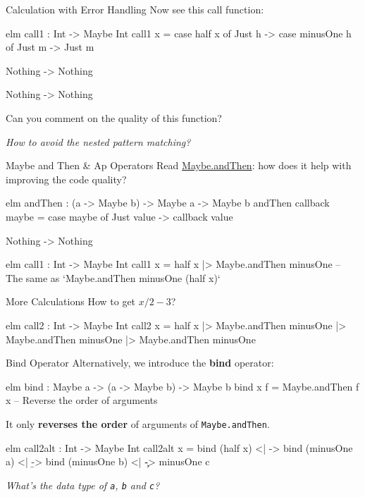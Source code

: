 \documentclass{beamer}
\begin{document}
\begin{frame}[fragile]{Calculation with Error Handling}
	Now see this call function:
	\begin{codetbox}{elm}
call1 : Int -> Maybe Int
call1 x =
    case half x of
        Just h ->
            case minusOne h of
                Just m ->
                    Just m

                Nothing ->
                    Nothing

        Nothing ->
            Nothing
	\end{codetbox}
	Can you comment on the quality of this function?

	\pause
	\em How to avoid the nested pattern matching? \em
\end{frame}

\begin{frame}[fragile]{Maybe and Then \& Ap Operators}
	Read \href{https://package.elm-lang.org/packages/elm/core/latest/Maybe#andThen}{Maybe.andThen}: how does it help with improving the code quality?
	\begin{codetbox}{elm}
andThen : (a -> Maybe b) -> Maybe a -> Maybe b
andThen callback maybe =
  case maybe of
    Just value ->
      callback value

    Nothing ->
      Nothing
	\end{codetbox}
	\begin{codetbox}{elm}
call1 : Int -> Maybe Int
call1 x =
    half x
        |> Maybe.andThen minusOne
-- The same as `Maybe.andThen minusOne (half x)`
	\end{codetbox}
\end{frame}

\begin{frame}[fragile]{More Calculations}
	How to get $x/2-3$?
	\pause
	\begin{codetbox}{elm}
call2 : Int -> Maybe Int
call2 x =
    half x
        |> Maybe.andThen minusOne
        |> Maybe.andThen minusOne
        |> Maybe.andThen minusOne
	\end{codetbox}
\end{frame}

\begin{frame}[fragile]{Bind Operator}
	Alternatively, we introduce the \textbf{bind} operator:
	\begin{codetbox}{elm}
bind : Maybe a -> (a -> Maybe b) -> Maybe b
bind x f =
    Maybe.andThen f x
-- Reverse the order of arguments     
	\end{codetbox}
	It only \textbf{reverses the order} of arguments of {\tt Maybe.andThen}.
	\pause
	\begin{codetbox}{elm}
call2alt : Int -> Maybe Int
call2alt x =
    bind (half x) <| \a ->
    bind (minusOne a) <| \b ->
    bind (minusOne b) <| \c ->
    minusOne c  
	\end{codetbox}
	\pause
	\em What's the data type of {\tt a}, {\tt b} and {\tt c}? \em
\end{frame}
\end{document}
